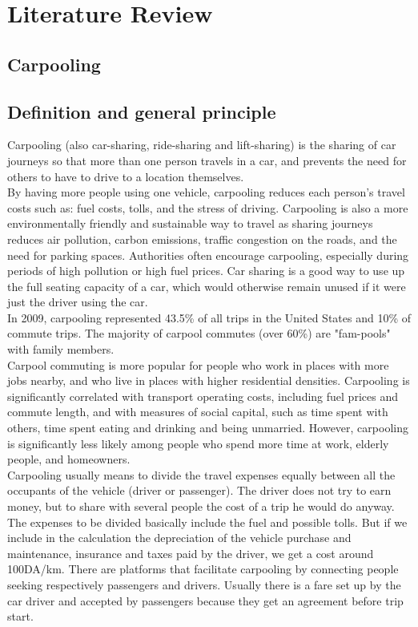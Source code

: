 \chapter{Literature Review} \label{chap:literatureReview}

\section*{Carpooling}

\section{Definition and general principle}
Carpooling (also car-sharing, ride-sharing and lift-sharing) is the sharing of car journeys       so that more than one person travels in a car, and prevents the need for others to have to drive to a location themselves.
\\ By having more people using one vehicle, carpooling reduces each person's travel costs 
such as: fuel costs, tolls, and the stress of driving. Carpooling is also a more environmentally 
friendly and sustainable way to travel as sharing journeys reduces air pollution, carbon 
emissions, traffic congestion on the roads, and the need for parking spaces. Authorities 
often encourage carpooling, especially during periods of high pollution or high fuel prices.
Car sharing is a good way to use up the full seating capacity of a car, which would otherwise 
remain unused if it were just the driver using the car.
\\ In 2009, carpooling represented 43.5\% of all trips in the United States and 10\% of 
commute trips. The majority of carpool commutes (over 60\%) are "fam-pools" with family 
members.
\\ Carpool commuting is more popular for people who work in places with more jobs 
nearby, and who live in places with higher residential densities. Carpooling is significantly 
correlated with transport operating costs, including fuel prices and commute length, and 
with measures of social capital, such as time spent with others, time spent eating and 
drinking and being unmarried. However, carpooling is significantly less likely among 
people who spend more time at work, elderly people, and homeowners. 
\\ Carpooling usually means to divide the travel expenses equally between all the 
occupants of the vehicle (driver or passenger). The driver does not try to earn money, but 
to share with several people the cost of a trip he would do anyway. The expenses to be 
divided basically include the fuel and possible tolls. But if we include in the calculation the 
depreciation of the vehicle purchase and maintenance, insurance and taxes paid by the 
driver, we get a cost around 100DA/km. There are platforms that facilitate carpooling by 
connecting people seeking respectively passengers and drivers. Usually there is a fare set 
up by the car driver and accepted by passengers because they get an agreement before trip 
start.

